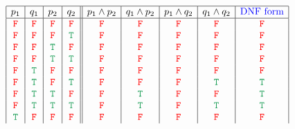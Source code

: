 \documentclass{article}
\begin{document}
\[\begin{array}{|c|c|c|c||c|c|c|c|c|}
\hline
p_1&q_1&p_2&q_2&p_1\land p_2&q_1\land p_2&p_1\land q_2&q_1\land q_2&\textcolor{blue}{\text{DNF form}}\\
\hline
\textcolor{red}{\tt{F}}&\textcolor{red}{\tt{F}}&\textcolor{red}{\tt{F}}&\textcolor{red}{\tt{F}}&\textcolor{red}{\tt{F}}&\textcolor{red}{\tt{F}}&\textcolor{red}{\tt{F}}&\textcolor{red}{\tt{F}}&\textcolor{red}{\tt{F}}\\
\textcolor{red}{\tt{F}}&\textcolor{red}{\tt{F}}&\textcolor{red}{\tt{F}}&\textcolor{ForestGreen}{\tt{T}}&\textcolor{red}{\tt{F}}&\textcolor{red}{\tt{F}}&\textcolor{red}{\tt{F}}&\textcolor{red}{\tt{F}}&\textcolor{red}{\tt{F}}\\
\textcolor{red}{\tt{F}}&\textcolor{red}{\tt{F}}&\textcolor{ForestGreen}{\tt{T}}&\textcolor{red}{\tt{F}}&\textcolor{red}{\tt{F}}&\textcolor{red}{\tt{F}}&\textcolor{red}{\tt{F}}&\textcolor{red}{\tt{F}}&\textcolor{red}{\tt{F}}\\
\textcolor{red}{\tt{F}}&\textcolor{red}{\tt{F}}&\textcolor{ForestGreen}{\tt{T}}&\textcolor{ForestGreen}{\tt{T}}&\textcolor{red}{\tt{F}}&\textcolor{red}{\tt{F}}&\textcolor{red}{\tt{F}}&\textcolor{red}{\tt{F}}&\textcolor{red}{\tt{F}}\\
\textcolor{red}{\tt{F}}&\textcolor{ForestGreen}{\tt{T}}&\textcolor{red}{\tt{F}}&\textcolor{red}{\tt{F}}&\textcolor{red}{\tt{F}}&\textcolor{red}{\tt{F}}&\textcolor{red}{\tt{F}}&\textcolor{red}{\tt{F}}&\textcolor{red}{\tt{F}}\\
\textcolor{red}{\tt{F}}&\textcolor{ForestGreen}{\tt{T}}&\textcolor{red}{\tt{F}}&\textcolor{ForestGreen}{\tt{T}}&\textcolor{red}{\tt{F}}&\textcolor{red}{\tt{F}}&\textcolor{red}{\tt{F}}&\textcolor{ForestGreen}{\tt{T}}&\textcolor{ForestGreen}{\tt{T}}\\
\textcolor{red}{\tt{F}}&\textcolor{ForestGreen}{\tt{T}}&\textcolor{ForestGreen}{\tt{T}}&\textcolor{red}{\tt{F}}&\textcolor{red}{\tt{F}}&\textcolor{ForestGreen}{\tt{T}}&\textcolor{red}{\tt{F}}&\textcolor{red}{\tt{F}}&\textcolor{ForestGreen}{\tt{T}}\\
\textcolor{red}{\tt{F}}&\textcolor{ForestGreen}{\tt{T}}&\textcolor{ForestGreen}{\tt{T}}&\textcolor{ForestGreen}{\tt{T}}&\textcolor{red}{\tt{F}}&\textcolor{ForestGreen}{\tt{T}}&\textcolor{red}{\tt{F}}&\textcolor{ForestGreen}{\tt{T}}&\textcolor{ForestGreen}{\tt{T}}\\
\textcolor{ForestGreen}{\tt{T}}&\textcolor{red}{\tt{F}}&\textcolor{red}{\tt{F}}&\textcolor{red}{\tt{F}}&\textcolor{red}{\tt{F}}&\textcolor{red}{\tt{F}}&\textcolor{red}{\tt{F}}&\textcolor{red}{\tt{F}}&\textcolor{red}{\tt{F}}\\

\end{array}\]
\end{document}
